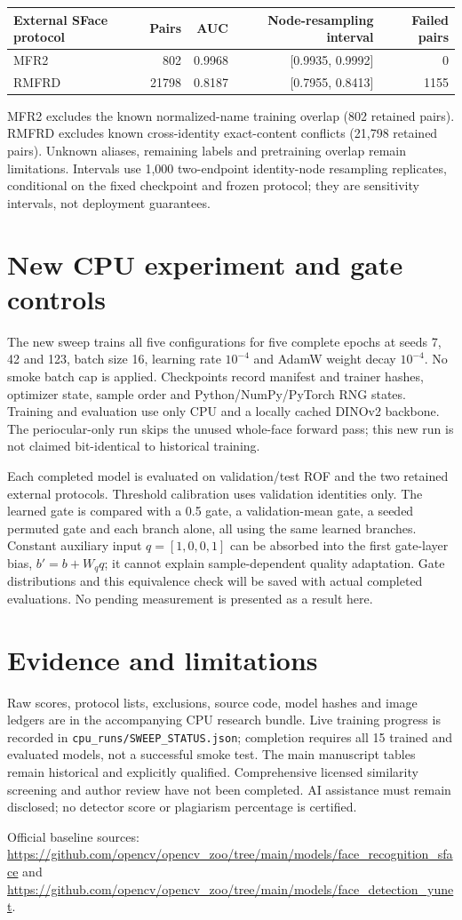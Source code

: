 \documentclass[10pt,journal,onecolumn,compsoc]{IEEEtran}
\begin{document}
\begin{center}
\begin{tabular}{lrrrr}\toprule
External SFace protocol & Pairs & AUC & Node-resampling interval & Failed pairs\\\midrule
MFR2 & 802 & 0.9968 & [0.9935, 0.9992] & 0\\
RMFRD & 21798 & 0.8187 & [0.7955, 0.8413] & 1155\\
\bottomrule\end{tabular}
\end{center}
MFR2 excludes the known normalized-name training overlap (802 retained pairs). RMFRD excludes known cross-identity exact-content conflicts (21,798 retained pairs). Unknown aliases, remaining labels and pretraining overlap remain limitations. Intervals use 1,000 two-endpoint identity-node resampling replicates, conditional on the fixed checkpoint and frozen protocol; they are sensitivity intervals, not deployment guarantees.
\section{New CPU experiment and gate controls}
The new sweep trains all five configurations for five complete epochs at seeds 7, 42 and 123, batch size 16, learning rate $10^{-4}$ and AdamW weight decay $10^{-4}$. No smoke batch cap is applied. Checkpoints record manifest and trainer hashes, optimizer state, sample order and Python/NumPy/PyTorch RNG states. Training and evaluation use only CPU and a locally cached DINOv2 backbone. The periocular-only run skips the unused whole-face forward pass; this new run is not claimed bit-identical to historical training.

Each completed model is evaluated on validation/test ROF and the two retained external protocols. Threshold calibration uses validation identities only. The learned gate is compared with a 0.5 gate, a validation-mean gate, a seeded permuted gate and each branch alone, all using the same learned branches. Constant auxiliary input $q=[1,0,0,1]$ can be absorbed into the first gate-layer bias, $b'=b+W_q q$; it cannot explain sample-dependent quality adaptation. Gate distributions and this equivalence check will be saved with actual completed evaluations. No pending measurement is presented as a result here.
\section{Evidence and limitations}
Raw scores, protocol lists, exclusions, source code, model hashes and image ledgers are in the accompanying CPU research bundle. Live training progress is recorded in \texttt{cpu\_runs/SWEEP\_STATUS.json}; completion requires all 15 trained and evaluated models, not a successful smoke test. The main manuscript tables remain historical and explicitly qualified. Comprehensive licensed similarity screening and author review have not been completed. AI assistance must remain disclosed; no detector score or plagiarism percentage is certified.

Official baseline sources: \url{https://github.com/opencv/opencv_zoo/tree/main/models/face_recognition_sface} and \url{https://github.com/opencv/opencv_zoo/tree/main/models/face_detection_yunet}.
\end{document}
